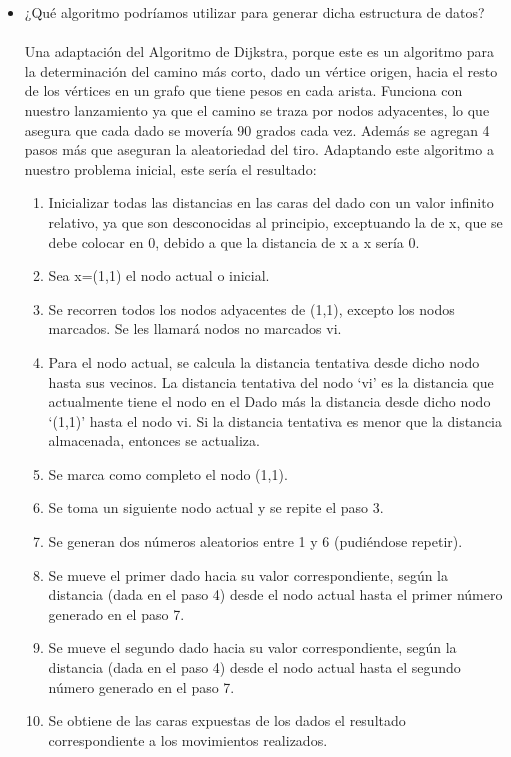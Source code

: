 \documentclass{article}
\begin{document}
\begin{itemize}
		\item{¿Qué algoritmo podríamos utilizar para generar dicha estructura de datos?}\\\\
		Una adaptación del Algoritmo de Dijkstra, porque este es un algoritmo para la determinación del camino más corto, dado un vértice origen, hacia el resto de los vértices en un grafo que tiene pesos en cada arista. Funciona con nuestro lanzamiento ya que el camino se traza por nodos adyacentes, lo que asegura que cada dado se movería 90 grados cada vez. Además se agregan 4 pasos más que aseguran la aleatoriedad del tiro. Adaptando este algoritmo a nuestro problema inicial, este sería el resultado:
		\begin{enumerate}
		    \item Inicializar todas las distancias en las caras del dado con un valor infinito relativo, ya que son desconocidas al principio, exceptuando la de x, que se debe colocar en 0, debido a que la distancia de x a x sería 0.
		    \item Sea x=(1,1) el nodo actual o inicial.
		    \item Se recorren todos los nodos adyacentes de (1,1), excepto los nodos marcados. Se les llamará nodos no marcados vi.
		    \item Para el nodo actual, se calcula la distancia tentativa desde dicho nodo hasta sus vecinos. La distancia tentativa del nodo ‘vi’ es la distancia que actualmente tiene el nodo en el Dado más la distancia desde dicho nodo ‘(1,1)’ hasta el nodo vi. Si la distancia tentativa es menor que la distancia almacenada, entonces se actualiza.
		    \item Se marca como completo el nodo (1,1).
		    \item Se toma un siguiente nodo actual y se repite el paso 3.
		    \item Se generan dos números aleatorios entre 1 y 6 (pudiéndose repetir). 
		    \item Se mueve el primer dado hacia su valor correspondiente, según la distancia (dada en el paso 4) desde el nodo actual hasta el primer número generado en el paso 7.
		    \item Se mueve el segundo dado hacia su valor correspondiente, según la distancia (dada en el paso 4) desde el nodo actual hasta el segundo número generado en el paso 7.
		    \item Se obtiene de las caras expuestas de los dados el resultado correspondiente a los movimientos realizados.
		\end{enumerate}

\end{itemize}
\end{document}
